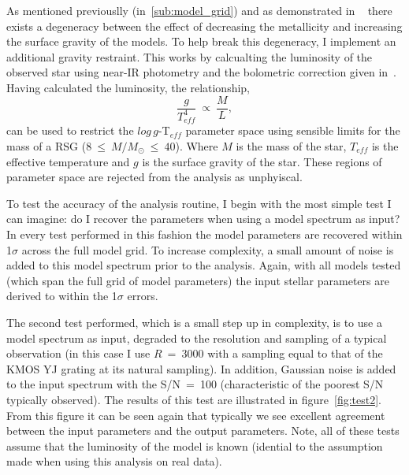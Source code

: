 \documentclass[12pt]{article}
\begin{document}
As mentioned previouslly (in~\ref{sub:model_grid}) and as demonstrated in
~\cite{2015ApJ...806...21D} there exists a degeneracy between the effect of decreasing the metallicity and increasing the surface gravity of the models.
To help break this degeneracy, I implement an additional gravity restraint.
This works by calcualting the luminosity of the observed star using near-IR photometry and the bolometric correction given in~\cite{Davies13b}.
Having calculated the luminosity, the relationship,
\begin{equation}
    \frac{g}{T^{4}_{eff}}~\propto~\frac{M}{L},
\end{equation}
can be used to restrict the $log\,g$-T$_{eff}$
parameter space using sensible limits for the mass of a RSG
($8~\leq~M/M_{\odot}~\leq~40$).
Where $M$ is the mass of the star,
$T_{eff}$ is the effective temperature and $g$ is the surface gravity of the star.
These regions of parameter space are rejected from the analysis as unphyiscal.

To test the accuracy of the analysis routine, I begin with the most simple test I can imagine:
do I recover the parameters when using a model spectrum as input?
In every test performed in this fashion the model parameters are recovered within 1$\sigma$ across the full model grid.
To increase complexity, a small amount of noise is added to this model spectrum prior to the analysis.
Again, with all models tested (which span the full grid of model parameters) the input stellar parameters are derived to within the 1$\sigma$ errors.

The second test performed, which is a small step up in complexity, is to use a model spectrum as input, degraded to the resolution and sampling of a typical observation (in this case I use $R~=~3000$ with a sampling equal to that of the KMOS YJ grating at its natural sampling).
In addition, Gaussian noise is added to the input spectrum with the S/N~=~100
(characteristic of the poorest S/N typically observed).
The results of this test are illustrated in figure~\ref{fig:test2}.
From this figure it can be seen again that typically we see excellent agreement between the input parameters and the output parameters.
Note, all of these tests assume that the luminosity of the model is known
(idential to the assumption made when using this analysis on real data).
\end{document}
